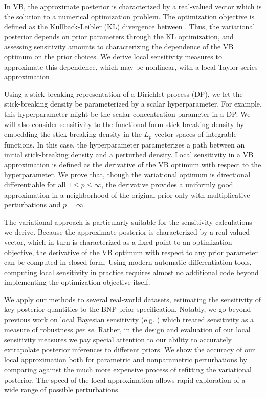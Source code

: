 In VB, the approximate posterior is characterized by a real-valued vector which
is the solution to a numerical optimization problem.
The optimization objective is defined as the Kullback-Leibler ($\mathrm{KL}$) divergence
between .
Thus, the variational posterior depends on prior parameters through the $\mathrm{KL}$
optimization,
and assessing sensitivity amounts to characterizing the dependence of
the VB optimum on the prior choices.
We derive local sensitivity measures to approximate this dependence,
which may be nonlinear,
with a local Taylor series approximation
\citep{gustafson:1996:local, giordano:2018:covariances}.

Using a stick-breaking representation of a Dirichlet process (DP), we
let the stick-breaking density be parameterized by a scalar hyperparameter.
For example, this hyperparameter might be the scalar concentration parameter in a DP.
We will also consider sensitivity to the functional form stick-breaking density
by embedding the
stick-breaking density in the $L_p$ vector spaces of integrable functions.
In this case, the hyperparameter parameterizes a path between
an initial stick-breaking density and a perturbed density.
Local sensitivity in a VB approximation is defined as the derivative
of the VB optimum with respect to the hyperparameter.
We prove that, though the variational optimum is directional differentiable for all
$1 \le p \le \infty$, the derivative provides a uniformly good approximation in
a neighborhood of the original prior only with multiplicative perturbations and
$p=\infty$.




The variational approach is particularly suitable for the
sensitivity calculations we derive.
Because the approximate posterior is characterized by a real-valued vector,
which in turn is characterized as a fixed point to an optimization
objective, the derivative of the VB optimum with respect to any prior
parameter can be computed in closed form.
Using modern automatic differentiation tools, computing local sensitivity
in practice requires almost no additional code beyond
implementing the optimization objective itself.


We apply our methods to several real-world datasets, estimating the sensitivity
of key posterior quantities to
the BNP prior specification.
Notably, we go beyond previous work on local Bayesian sensitivity (e.g. \citet{basu:1996:local})
which treated sensitivity as a measure of robustness \textit{per se}.
Rather, in the design and evaluation of our local sensitivity
measures we pay special attention to our ability
to accurately extrapolate posterior inferences to different priors.
We show the accuracy of our local approximation both for
parametric and nonparametric perturbations by comparing
against the much more expensive process of refitting the variational posterior.
The speed of the local approximation allows rapid exploration of a wide range of
possible perturbations.

